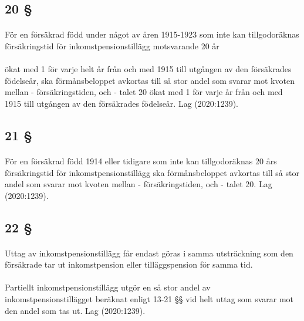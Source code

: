 \documentclass[a4paper,notitlepage,openany,10pt]{book}
\begin{document}
\subsection*{20 §}
\paragraph*{}
För en försäkrad född under något av åren 1915-1923 som inte kan tillgodoräknas försäkringstid för inkomstpensionstillägg motsvarande 20 år
\paragraph*{}
ökat med 1 för varje helt år från och med 1915 till utgången av den försäkrades födelseår, ska förmånsbeloppet avkortas till så stor andel som svarar mot kvoten mellan
\newline - försäkringstiden, och
\newline - talet 20 ökat med 1 för varje år från och med 1915 till utgången av den försäkrades födelseår.
Lag (2020:1239).
\subsection*{21 §}
\paragraph*{}
För en försäkrad född 1914 eller tidigare som inte kan tillgodoräknas 20 års försäkringstid för inkomstpensionstillägg ska förmånsbeloppet avkortas till så stor andel som svarar mot kvoten mellan
\newline - försäkringstiden, och
\newline - talet 20.
Lag (2020:1239).
\subsection*{22 §}
\paragraph*{}
Uttag av inkomstpensionstillägg får endast göras i samma utsträckning som den försäkrade tar ut inkomstpension eller tilläggspension för samma tid.
\paragraph*{}
Partiellt inkomstpensionstillägg utgör en så stor andel av inkomstpensionstillägget beräknat enligt 13-21 §§ vid helt uttag som svarar mot den andel som tas ut.
Lag (2020:1239).
\end{document}
